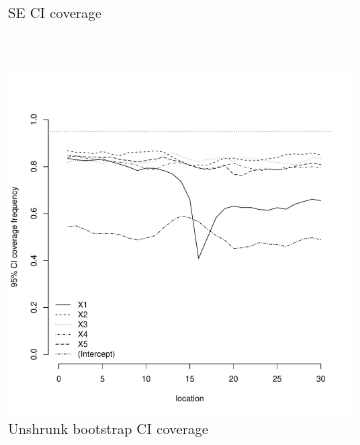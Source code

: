 \documentclass[authoryear, review, 11pt]{elsarticle}
\begin{document}
\begin{figure}
\begin{subfigure}[b]{0.45\textwidth}
		\caption{SE CI coverage}
	\end{subfigure}%
	\\%
	\begin{subfigure}[b]{0.45\textwidth}
	\centering
		\includegraphics[width=\textwidth]{../../figures/simulation/15.23.profile_unshrunk_bootstrap_coverage.pdf}
		\caption{Unshrunk bootstrap CI coverage}
	\end{subfigure}%
	~ %
	\begin{subfigure}[b]{0.45\textwidth}
	\centering

\end{subfigure}
\end{figure}
\end{document}
